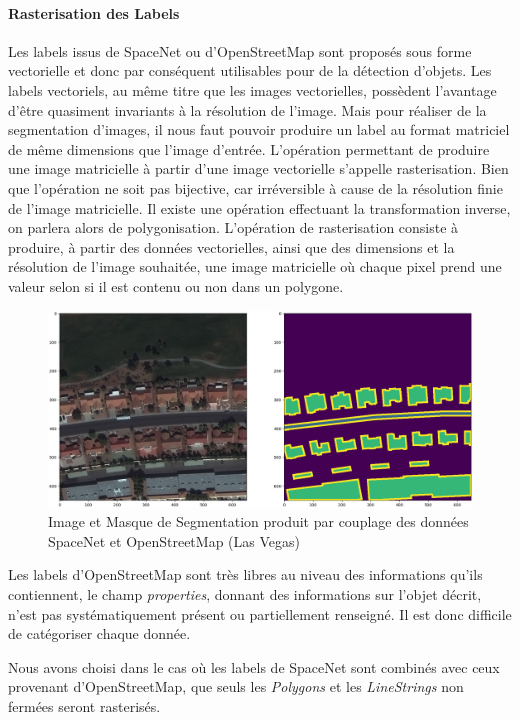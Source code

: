 \documentclass[a4paper, 11pt]{report}
\begin{document}
\paragraph{Rasterisation des Labels}
Les labels issus de SpaceNet ou d'OpenStreetMap sont proposés sous forme vectorielle et donc par conséquent utilisables pour de la détection d'objets.
Les labels vectoriels, au même titre que les images vectorielles, possèdent l'avantage d'être quasiment invariants à la résolution de l'image.
Mais pour réaliser de la segmentation d'images, il nous faut pouvoir produire un label au format matriciel de même dimensions que l'image d'entrée.
L'opération permettant de produire une image matricielle à partir d'une image vectorielle s'appelle rasterisation. Bien que l'opération ne soit pas bijective, car irréversible à cause de la résolution finie de l'image matricielle. Il existe une opération effectuant la transformation inverse, on parlera alors de polygonisation.
L'opération de rasterisation consiste à produire, à partir des données vectorielles, ainsi que des dimensions et la résolution de l'image souhaitée, une image matricielle où chaque pixel prend une valeur selon si il est contenu ou non dans un polygone.
\begin{figure}[H]
	\begin{center}
		\includegraphics[scale=0.3]{Images/MUL_PAN_Label_Vegas.png}
		\caption{Image et Masque de Segmentation produit par couplage des données SpaceNet et OpenStreetMap (Las Vegas)}
	\end{center}
\end{figure}
Les labels d'OpenStreetMap sont très libres au niveau des informations qu'ils contiennent, le champ \emph{properties}, donnant des informations sur l'objet décrit, n'est pas systématiquement présent ou partiellement renseigné. Il est donc difficile de catégoriser chaque donnée.

Nous avons choisi dans le cas où les labels de SpaceNet sont combinés avec ceux provenant d'OpenStreetMap, que seuls les \emph{Polygons} et les \emph{LineStrings} non fermées seront rasterisés.
\end{document}
